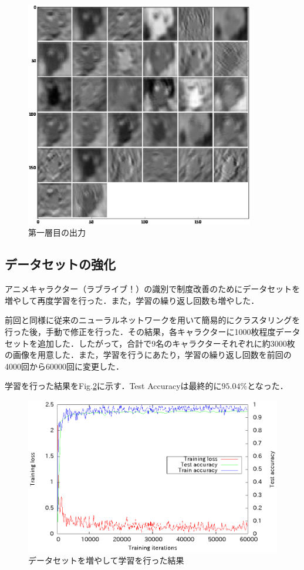 \documentclass[a4paper,10pt]{jsarticle}
\begin{document}
\begin{figure}[tb]
 \begin{center}
  \includegraphics[clip,width=10cm]{./fig/eps/outputeri.eps}
 \end{center}
 \caption{第一層目の出力}
 \label{outputeri}
\end{figure}

\subsection{データセットの強化}

アニメキャラクター（ラブライブ！）の識別で制度改善のためにデータセットを増やして再度学習を行った．また，学習の繰り返し回数も増やした．

前回と同様に従来のニューラルネットワークを用いて簡易的にクラスタリングを行った後，手動で修正を行った．その結果，各キャラクターに1000枚程度データセットを追加した．したがって，合計で9名のキャラクターそれぞれに約3000枚の画像を用意した．また，学習を行うにあたり，学習の繰り返し回数を前回の4000回から60000回に変更した．

学習を行った結果をFig.\ref{181752_26Jul15}に示す．Test Accuracyは最終的に$95.04\%$となった．
\begin{figure}[tb]
  \begin{center}
    \includegraphics[clip,width=12cm]{./fig/eps/result_train_test_lovelive_full.eps}
  \end{center}
  \caption{データセットを増やして学習を行った結果}
  \label{181752_26Jul15}
\end{figure}
\end{document}
